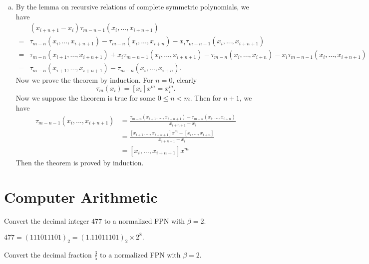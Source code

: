 \documentclass[11pt]{elegantbook}
\begin{document}
\begin{solution}
\begin{enumerate}[(a)]
    \item By the lemma on recursive relations of complete symmetric polynomials, we have
    \begin{align*}
      &(x_{i+n+1}-x_i)\tau_{m-n-1}(x_i,...,x_{i+n+1})\\
      =&\tau_{m-n}(x_i,...,x_{i+n+1})-\tau_{m-n}(x_i,...,x_{i+n})-x_i\tau_{m-n-1}(x_i,...,x_{i+n+1})\\
      =&\tau_{m-n}(x_{i+1},...,x_{i+n+1})+x_i\tau_{m-n-1}(x_i,...,x_{i+n+1})-\tau_{m-n}(x_i,...,x_{i+n})-x_i\tau_{m-n-1}(x_i,...,x_{i+n+1})\\
      =&\tau_{m-n}(x_{i+1},...,x_{i+n+1})-\tau_{m-n}(x_i,...,x_{i+n}).
    \end{align*}
    Now we prove the theorem by induction. For $n=0$, clearly
    \begin{equation*}
      \tau_m(x_i)=[x_i]x^m=x_i^m.
    \end{equation*}
    Now we suppose the theorem is true for some $0\leq n<m$. Then for $n+1$, we have
    \begin{align*}
      \tau_{m-n-1}(x_i,...,x_{i+n+1})&=\frac{\tau_{m-n}(x_{i+1},...,x_{i+n+1})-\tau_{m-n}(x_i,...,x_{i+n})}{x_{i+n+1}-x_{i}}\\
      &=\frac{[x_{i+1},...,x_{i+n+1}]x^m-[x_i,...,x_{i+n}]}{x_{i+n+1}-x_{i}}\\
      &=[x_i,...,x_{i+n+1}]x^m
    \end{align*}
    Then the theorem is proved by induction.
  \end{enumerate}
\end{solution}

\chapter{Computer Arithmetic}

\begin{problem}
  Convert the decimal integer $477$ to a normalized FPN with $\beta=2$.
\end{problem}

\begin{solution}
  $477=(111011101)_2=(1.11011101)_2\times 2^8.$
\end{solution}

\vspace{1em}

\begin{problem}
  Convert the decimal fraction $\frac{3}{5}$ to a normalized FPN with $\beta=2$.
\end{problem}
\end{document}
